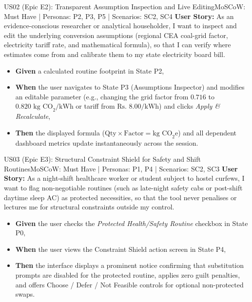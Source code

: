\documentclass[12pt, a4paper]{article}
\begin{document}
\begin{storybox}{US02 (Epic E2): Transparent Assumption Inspection and Live Editing}{MoSCoW: Must Have | Personas: P2, P3, P5 | Scenarios: SC2, SC4}
\textbf{User Story:} As an evidence-conscious researcher or analytical householder, I want to inspect and edit the underlying conversion assumptions (regional CEA coal-grid factor, electricity tariff rate, and mathematical formula), so that I can verify where estimates come from and calibrate them to my state electricity board bill.
\begin{itemize}
    \item \textbf{Given} a calculated routine footprint in State P2,
    \item \textbf{When} the user navigates to State P3 (Assumptions Inspector) and modifies an editable parameter (e.g., changing the grid factor from $0.716$ to $0.820\text{ kg CO}_2\text{/kWh}$ or tariff from $\text{Rs. }8.00\text{/kWh}$) and clicks \textit{Apply \& Recalculate},
    \item \textbf{Then} the displayed formula ($\text{Qty} \times \text{Factor} = \text{kg CO}_2\text{e}$) and all dependent dashboard metrics update instantaneously across the session.
\end{itemize}
\end{storybox}

\begin{storybox}{US03 (Epic E3): Structural Constraint Shield for Safety and Shift Routines}{MoSCoW: Must Have | Personas: P1, P4 | Scenarios: SC2, SC3}
\textbf{User Story:} As a night-shift healthcare worker or student subject to hostel curfews, I want to flag non-negotiable routines (such as late-night safety cabs or post-shift daytime sleep AC) as protected necessities, so that the tool never penalises or lectures me for structural constraints outside my control.
\begin{itemize}
    \item \textbf{Given} the user checks the \textit{Protected Health/Safety Routine} checkbox in State P0,
    \item \textbf{When} the user views the Constraint Shield action screen in State P4,
    \item \textbf{Then} the interface displays a prominent notice confirming that substitution prompts are disabled for the protected routine, applies zero guilt penalties, and offers Choose / Defer / Not Feasible controls for optional non-protected swaps.
\end{itemize}
\end{storybox}
\end{document}
